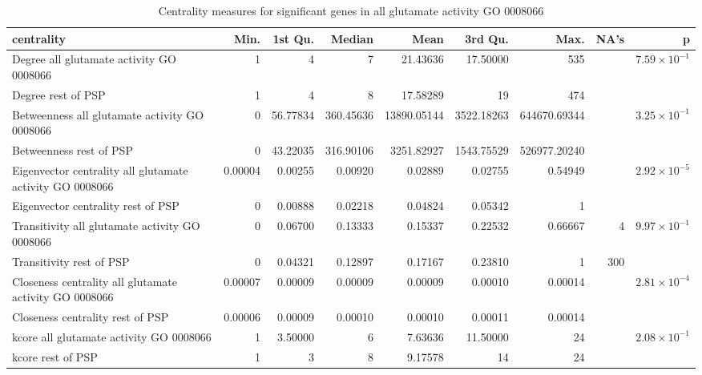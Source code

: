 \begin{table}[ht]
\centering
\begin{adjustbox}{width=\textwidth}
\begin{tabular}{lrrrrrrrr}
  \hline
centrality & Min. & 1st Qu. & Median & Mean & 3rd Qu. & Max. & NA's & p \\ 
  \hline
Degree all glutamate activity GO 0008066 & 1   & 4   & 7   & 21.43636 & 17.50000 & 535   &  & $7.59 \times 10^{-1}$ \\ 
  Degree rest of PSP & 1   & 4   & 8   & 17.58289 & 19   & 474   &  &     \\ 
  Betweenness all glutamate activity GO 0008066 & 0   & 56.77834 & 360.45636 & 13890.05144 & 3522.18263 & 644670.69344 &  & $3.25 \times 10^{-1}$ \\ 
  Betweenness rest of PSP & 0   & 43.22035 & 316.90106 & 3251.82927 & 1543.75529 & 526977.20240 &  &     \\ 
  Eigenvector centrality all glutamate activity GO 0008066 & 0.00004 & 0.00255 & 0.00920 & 0.02889 & 0.02755 & 0.54949 &  & $2.92 \times 10^{-5}$ \\ 
  Eigenvector centrality rest of PSP & 0   & 0.00888 & 0.02218 & 0.04824 & 0.05342 & 1   &  &     \\ 
  Transitivity all glutamate activity GO 0008066 & 0   & 0.06700 & 0.13333 & 0.15337 & 0.22532 & 0.66667 & 4 & $9.97 \times 10^{-1}$ \\ 
  Transitivity rest of PSP & 0   & 0.04321 & 0.12897 & 0.17167 & 0.23810 & 1   & 300 &     \\ 
  Closeness centrality all glutamate activity GO 0008066 & 0.00007 & 0.00009 & 0.00009 & 0.00009 & 0.00010 & 0.00014 &  & $2.81 \times 10^{-4}$ \\ 
  Closeness centrality rest of PSP & 0.00006 & 0.00009 & 0.00010 & 0.00010 & 0.00011 & 0.00014 &  &     \\ 
  kcore all glutamate activity GO 0008066 & 1   & 3.50000 & 6   & 7.63636 & 11.50000 & 24   &  & $2.08 \times 10^{-1}$ \\ 
  kcore rest of PSP & 1   & 3   & 8   & 9.17578 & 14   & 24   &  &     \\ 
   \hline
\end{tabular}
\end{adjustbox}
\caption{Centrality measures for significant genes in all glutamate activity GO 0008066} 
\label{tab:Centrality measures for significant genes in all glutamate activity GO 0008066}
\end{table}

